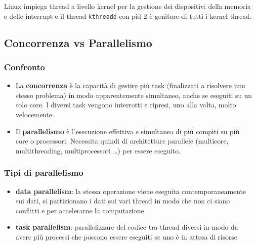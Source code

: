 \documentclass[a4paper]{article}
\begin{document}
Linux impiega thread a livello kernel per la gestione dei dispositivi della memoria e delle interrupt e il thread \verb|kthreadd|
con pid 2 è genitore di tutti i kernel thread.



\subsection{Concorrenza vs Parallelismo}
\subsubsection*{Confronto}
\begin{itemize}
	\item La \textbf{concorrenza} è la capacità di gestire più task (finalizzati a risolvere uno stesso problema) in modo
	apparentemente simultaneo, anche se eseguiti su un solo core. I diversi task vengono interrotti e ripresi, uno alla volta,
	molto velocemente.
	\item Il \textbf{parallelismo} è l’esecuzione effettiva e simultanea di più compiti su più core o processori. Necessita
	quindi di architetture parallele (multicore, multithreading, multiprocessori \dots) per essere eseguito.
\end{itemize}

\subsubsection*{Tipi di parallelismo}
\begin{itemize}
	\item \textbf{data parallelism}: la stessa operazione viene eseguita contemporaneamente sui dati, si partizionano i dati
	sui vari thread in modo che non ci siano conflitti e per accelerarne la computazione
	\item \textbf{task parallelism}: parallelizzare del codice tra thread diversi in modo da avere più processi che possono
	essere eseguiti se uno è in attesa di risorse
\end{itemize}
\end{document}
